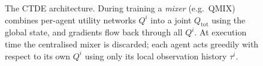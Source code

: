 \begin{figure}[ht]
\caption{The CTDE architecture. During training a \emph{mixer}
  (e.g.\ QMIX) combines per-agent utility networks $Q^i$ into a
  joint $Q_\mathrm{tot}$ using the global state, and gradients flow
  back through all $Q^i$. At execution time the centralised mixer is
  discarded; each agent acts greedily with respect to its own $Q^i$
  using only its local observation history $\tau^i$.}
\label{fig:ctde}
\end{figure}





